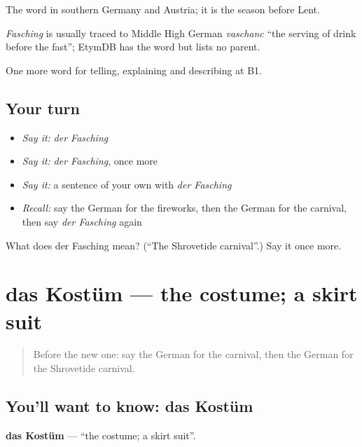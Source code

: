 The word in southern Germany and Austria; it is the season before Lent.

\begin{cousinweb}
\emph{Fasching} is usually traced to Middle High German \emph{vaschanc} \textquotedblleft{}the serving of drink before the fast\textquotedblright{}; EtymDB has the word but lists no parent.
\end{cousinweb}

\begin{grammarlens}[title={What you've built}]
One more word for telling, explaining and describing at B1.
\end{grammarlens}

\subsection*{Your turn}
\begin{itemize}
\raggedright
  \item \emph{Say it:} \emph{der Fasching}
  \item \emph{Say it:} \emph{der Fasching}, once more
  \item \emph{Say it:} a sentence of your own with \emph{der Fasching}
  \item \emph{Recall:} say the German for the fireworks, then the German for the carnival, then say \emph{der Fasching} again
\end{itemize}

\begin{tcolorbox}[breakable,colback=teal!4,colframe=teal!35!black,title={Before you move on}]
What does der Fasching mean? (\textquotedblleft{}The Shrovetide carnival\textquotedblright{}.) Say it once more.
\end{tcolorbox}
\section[das Kostüm]{das Kostüm — the costume; a skirt suit}

\label{lesson:GE-C310-kostuem}



\begin{quote}
Before the new one: say the German for the carnival, then the German for the Shrovetide carnival.
\end{quote}

\subsection*{You'll want to know: das Kostüm}
\textbf{das Kostüm} — \textquotedblleft{}the costume; a skirt suit\textquotedblright{}.

